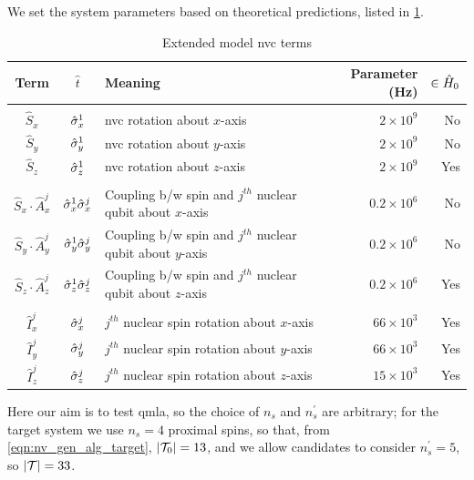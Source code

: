 \par 
We set the system parameters based on theoretical predictions, listed in \cref{table:nv_gen_alg_term_params}.

\begin{table}
    \begin{tabular}{cclrr}
        Term & $\hat{t}$ & Meaning & Parameter (Hz) & $ \in \hat{H}_0$ \\
        \hline
        \\
        $\hat{S}_x$ & $\hat{\sigma}_{x}^1$ & \gls{nvc} rotation about $x$-axis & $ 2\times 10^9 $ & No \\
        $\hat{S}_y$ & $\hat{\sigma}_{y}^1$ & \gls{nvc} rotation about $y$-axis & $ 2\times 10^9 $ & No \\
        $\hat{S}_z$ & $\hat{\sigma}_{z}^1$ & \gls{nvc} rotation about $z$-axis & $ 2\times 10^9 $ & Yes \\
        \\
        $\hat{S}_x \cdot \hat{A}_x^j$ & $\hat{\sigma}_{x}^1 \hat{\sigma}_{x}^j$ & Coupling b/w spin and $j^{th}$ nuclear qubit about $x$-axis & $ 0.2 \times 10^6 $ & No \\
        $\hat{S}_y \cdot \hat{A}_y^j$ & $\hat{\sigma}_{y}^1 \hat{\sigma}_{y}^j$ & Coupling b/w spin and $j^{th}$ nuclear qubit about $y$-axis & $ 0.2 \times 10^6 $ & No \\
        $\hat{S}_z \cdot \hat{A}_z^j$ & $\hat{\sigma}_{z}^1 \hat{\sigma}_{z}^j$ & Coupling b/w spin and $j^{th}$ nuclear qubit about $z$-axis & $ 0.2 \times 10^6 $ & Yes \\
        \\
        $\hat{I}_x^j$ & $\hat{\sigma}_{x}^j$ & $j^{th}$ nuclear spin rotation about $x$-axis & $ 66\times 10^3$ & Yes \\
        $\hat{I}_y^j$ & $\hat{\sigma}_{y}^j$ & $j^{th}$ nuclear spin rotation about $y$-axis & $ 66\times 10^3 $ & Yes \\
        $\hat{I}_z^j$ & $\hat{\sigma}_{z}^j$ & $j^{th}$ nuclear spin rotation about $z$-axis & $ 15\times 10^3 $ & Yes \\
        \hline 
    \end{tabular}
    \caption[Extended model \gls{nvc} terms]{
        Extended model \gls{nvc} terms
    }
    \label{table:nv_gen_alg_term_params}
\end{table}

Here our aim is to test \gls{qmla}, so the choice of $n_s$ and $n_s^{\prime}$ are arbitrary; 
    for the target system we use $n_s=4$ proximal spins, 
    so that, from \cref{eqn:nv_gen_alg_target},  $\left\lvert { \mathcal{T} }_0 \right\rvert = 13$,
    and we allow candidates to consider $n_s^{\prime}=5$, 
    so $\left\lvert { \mathcal{T} } \right\rvert = 33$. 
\par 

